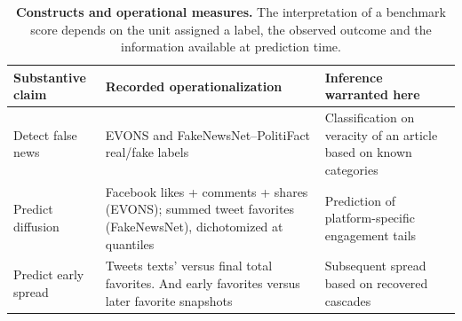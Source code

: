\begin{table}[!ht]
\centering
\caption{{\bf Constructs and operational measures.} The interpretation of a benchmark score depends on the unit assigned a label, the observed outcome and the information available at prediction time.}
\label{tab:construct-map}
\footnotesize
\begin{tabular}{@{}>{\raggedright\arraybackslash}p{1.00in}>{\raggedright\arraybackslash}p{1.66in}>{\raggedright\arraybackslash}p{2.23in}@{}}
\toprule
Substantive claim & Recorded operationalization & Inference warranted here \\
\midrule
Detect false news & EVONS and FakeNewsNet--PolitiFact real/fake labels & Classification on veracity of an article based on known categories \\
\addlinespace
Predict diffusion & Facebook likes + comments + shares (EVONS); summed tweet favorites (FakeNewsNet), dichotomized at quantiles & Prediction of platform-specific engagement tails \\
\addlinespace
Predict early spread & Tweets texts' versus final total favorites. And early favorites versus later favorite snapshots & Subsequent spread based on recovered cascades \\
\bottomrule
\end{tabular}
\end{table}

